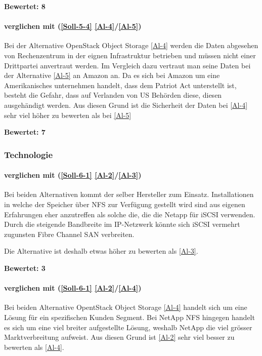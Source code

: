 \textbf{Bewertet: 8}

\paragraph*{  verglichen mit  (\ref{Soll-5-4} \ref{Al-4}/\ref{Al-5})}
Bei der Alternative OpenStack Object Storage \ref{Al-4} werden die Daten abgesehen von Rechenzentrum in der eignen Infrastruktur betrieben und müssen nicht einer Drittpartei anvertraut werden. Im Vergleich dazu vertraut man seine Daten bei der Alternative \ref{Al-5} an Amazon an. Da es sich bei Amazon um eine Amerikanisches unternehmen handelt, dass dem Patriot Act unterstellt ist, besteht die Gefahr, dass auf Verlanden von US Behörden diese, diesen ausgehändigt werden. Aus diesen Grund ist die Sicherheit der Daten bei  \ref{Al-4} sehr viel höher zu bewerten als bei  \ref{Al-5}

\textbf{Bewertet: 7}

\subsubsection{Technologie}

\paragraph*{  verglichen mit  (\ref{Soll-6-1} \ref{Al-2}/\ref{Al-3})}
Bei beiden Alternativen kommt der selber Hersteller zum Einsatz. Installationen in welche der Speicher über NFS zur Verfügung gestellt wird sind aus eigenen Erfahrungen eher anzutreffen als solche die, die die Netapp für iSCSI verwenden. Durch die steigende Bandbreite im IP-Netzwerk könnte sich iSCSI vermehrt zugunsten Fibre Channel SAN verbreiten.

Die Alternative   ist deshalb etwas höher zu bewerten als  \ref{Al-3}.

\textbf{Bewertet: 3}

\paragraph*{  verglichen mit  (\ref{Soll-6-1} \ref{Al-2}/\ref{Al-4})}
Bei beiden Alternative OpentStack Object Storage \ref{Al-4} handelt sich um eine Lösung für ein spezifischen Kunden Segment. Bei NetApp NFS hingegen handelt es sich um eine viel breiter aufgestellte Lösung, weshalb NetApp die viel grösser Marktverbreitung aufweist. Aus diesen Grund ist  \ref{Al-2} sehr viel besser zu bewerten als  \ref{Al-4}.

